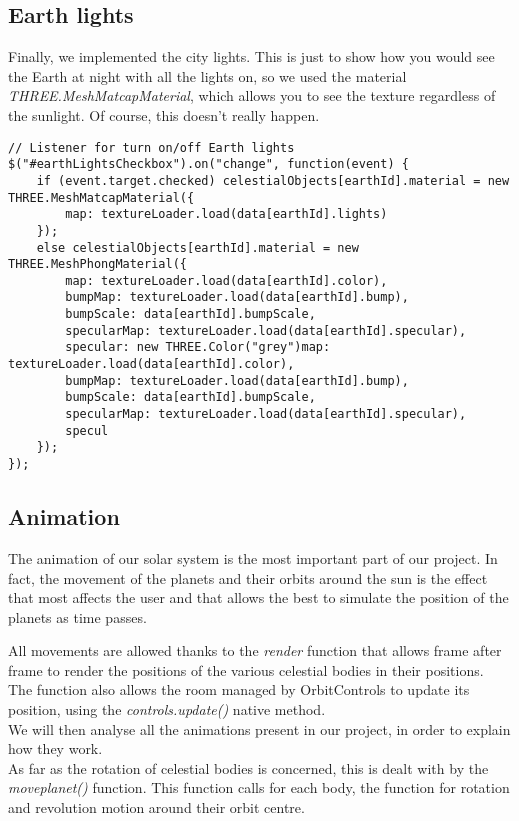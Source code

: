 \documentclass{article}
\begin{document}
\subsection{Earth lights}
Finally, we implemented the city lights. This is just to show how you would see the Earth at night with all the lights on, so we used the material \textit{THREE.MeshMatcapMaterial}, which allows you to see the texture regardless of the sunlight. Of course, this doesn't really happen.
\begin{lstlisting}
// Listener for turn on/off Earth lights
$("#earthLightsCheckbox").on("change", function(event) {
	if (event.target.checked) celestialObjects[earthId].material = new THREE.MeshMatcapMaterial({
		map: textureLoader.load(data[earthId].lights)
	});
	else celestialObjects[earthId].material = new THREE.MeshPhongMaterial({
		map: textureLoader.load(data[earthId].color),
		bumpMap: textureLoader.load(data[earthId].bump),
		bumpScale: data[earthId].bumpScale,
		specularMap: textureLoader.load(data[earthId].specular),
		specular: new THREE.Color("grey")map: textureLoader.load(data[earthId].color),
		bumpMap: textureLoader.load(data[earthId].bump),
		bumpScale: data[earthId].bumpScale,
		specularMap: textureLoader.load(data[earthId].specular),
		specul
	});
});
\end{lstlisting}


\subsection{Animation}
The animation of our solar system is the most important part of our project. In fact, the movement of the planets and their orbits around the sun is the effect that most affects the user and that allows the best to simulate the position of the planets as time passes.
\par All movements are allowed thanks to the \textit{render} function that allows frame after frame to render the positions of the various celestial bodies in their positions.\\
The function also allows the room managed by OrbitControls to update its position, using the \textit{controls.update()} native method\cite{documentation:threejs}. \\
We will then analyse all the animations present in our project, in order to explain how they work.\\
As far as the rotation of celestial bodies is concerned, this is dealt with by the \textit{moveplanet()} function. This function calls for each body, the function for rotation and revolution motion around their orbit centre.
\end{document}
